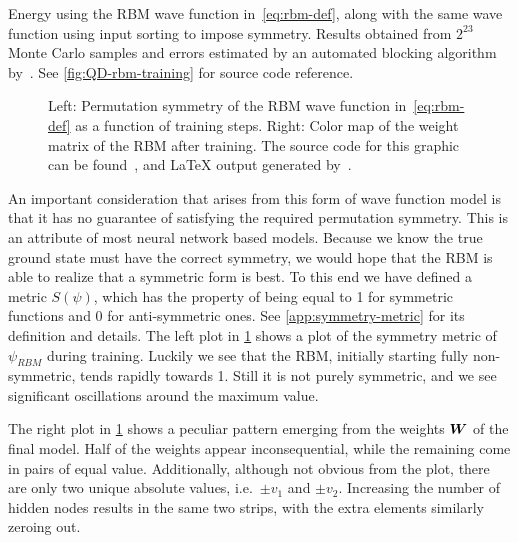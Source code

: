 \documentclass[Thesis.tex]{subfiles}
\begin{document}
\begin{table}[h]
  \centering
  
  \caption{Energy using the RBM wave function in~\cref{eq:rbm-def}, along with
the same wave function using input sorting to impose symmetry. Results obtained
from $2^{23}$ Monte Carlo samples and errors estimated by an automated blocking
algorithm by~\textcite{Jonsson-2018}. See
\cref{fig:QD-rbm-training} for source code reference.}
  \label{tab:rbm-energy-results}
\end{table}

\begin{figure}[h]
   \centering
    \resizebox{\linewidth}{!}{%
        
    }
    \caption{\label{fig:QD-rbm-symmetry}Left: Permutation symmetry of the RBM wave
function in~\cref{eq:rbm-def} as a function of training steps. Right: Color map
of the weight matrix of the RBM after training. The source code for this graphic
can be found~\cite[TODO: Add path]{MS-thesis-repository}, and \LaTeX{} output
generated by~\cite{nico_schlomer_2018_1173090}.}
\end{figure}

An important consideration that arises from this form of wave function model
is that it has no guarantee of satisfying the required permutation symmetry.
This is an attribute of most neural network based models. Because we know the
true ground state must have the correct symmetry, we would hope that the RBM is
able to realize that a symmetric form is best. To this end we have defined a
metric $S(\psi)$, which has the property of being equal to 1 for symmetric
functions and $0$ for anti-symmetric ones. See \cref{app:symmetry-metric} for
its definition and details. The left plot in \cref{fig:QD-rbm-symmetry} shows a
plot of the symmetry metric of $\psi_{RBM}$ during training. Luckily we see
that the RBM, initially starting fully non-symmetric, tends rapidly towards
1. Still it is not purely symmetric, and we see significant
oscillations around the maximum value.

The right plot in \cref{fig:QD-rbm-symmetry} shows a peculiar pattern emerging
from the weights $\bm{W}$ of the final model. Half of the weights appear
inconsequential, while the remaining come in pairs of equal value. Additionally,
although not obvious from the plot, there are only two unique absolute values,
i.e.\ $\pm v_1$ and $\pm v_2$. Increasing the number of hidden nodes results in
the same two strips, with the extra elements similarly zeroing out.
\end{document}
